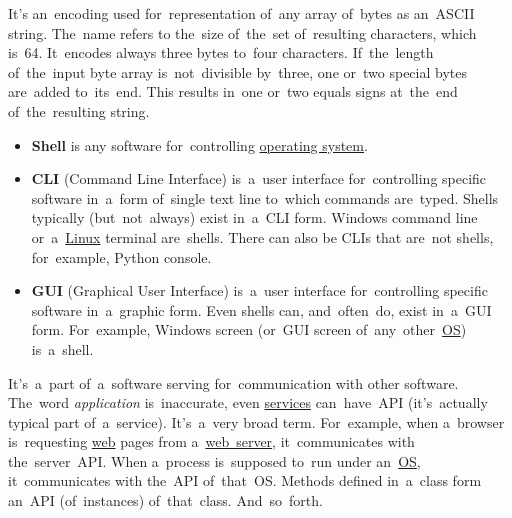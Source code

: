 \label{base64}
It's an~encoding used for~representation of~any array of~bytes as an~ASCII string. The~name refers to the~size of~the~set of~resulting characters, which is~64. It~encodes always three bytes to~four characters. If~the~length of~the~input byte array is~not~divisible by~three, one or~two special bytes are~added to~its~end. This results in~one or~two equals signs at~the~end of~the~resulting string.

\label{shellcligui}
\begin{itemize}
    \item \textbf{Shell} is any software for~controlling \hyperref[os]{operating system}.
    \item \textbf{CLI} (Command Line Interface) is~a~user interface for~controlling specific software in~a~form of~single text line to~which commands are~typed. Shells typically (but~not~always) exist in~a~CLI form. Windows command line or~a~\hyperref[linux]{Linux} terminal are~shells. There can also be CLIs that are~not shells, for~example, Python console.
    \item \textbf{GUI} (Graphical User Interface) is~a~user interface for~controlling specific software in~a~graphic form. Even shells can, and~often~do, exist in~a~GUI form. For~example, Windows screen (or~GUI screen of~any~other~\hyperref[os]{OS}) is~a~shell.
\end{itemize}

\label{api}
It's~a~part of~a~software serving for~communication with other software. The~word \textit{application} is~inaccurate, even \hyperref[applicationprocessprogramservicethread]{services} can~have~API (it's~actually typical part of~a~service). It's~a~very broad term. For~example, when a~browser is~requesting \hyperref[internetweb]{web} pages from a~\hyperref[webserver]{web~server}, it~communicates with the~server~API. When a~process is~supposed to~run under an~\hyperref[os]{OS}, it~communicates with the~API of~that~OS. Methods defined in~a~class form an~API (of~instances) of~that~class. And~so~forth.
